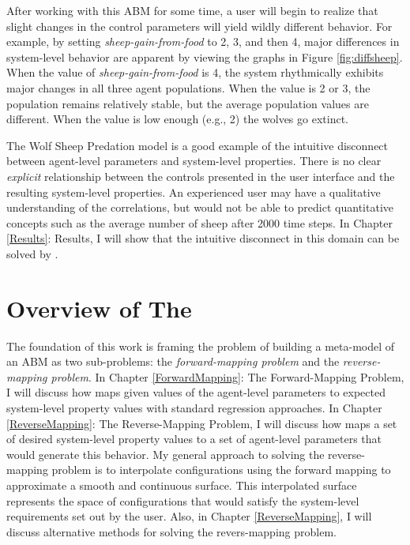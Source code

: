 After working with this ABM for some time, a user will begin to realize that slight changes in the control parameters will yield wildly different behavior.
For example, by setting \textit{sheep-gain-from-food} to 2, 3, and then 4, major differences in system-level behavior are apparent by viewing the graphs in Figure \ref{fig:diffsheep}.
When the value of \textit{sheep-gain-from-food} is 4, the system rhythmically exhibits major changes in all three agent populations.
When the value is 2 or 3, the population remains relatively stable, but the average population values are different.
When the value is low enough (e.g., 2) the wolves go extinct.

The Wolf Sheep Predation model is a good example of the intuitive disconnect between agent-level parameters and system-level properties.
There is no clear \textit{explicit} relationship between the controls presented in the user interface and the resulting system-level properties.
An experienced user may have a qualitative understanding of the correlations, but would not be able to predict quantitative concepts such as the average number of sheep after 2000 time steps.
In  Chapter \ref{Results}: Results, I will show that the intuitive disconnect in this domain can be solved by \fw.


\section{Overview of The \framework}


The foundation of this work is framing the problem of building a meta-model of an ABM as two sub-problems: the \textit{forward-mapping problem} and the \textit{reverse-mapping problem}.
In Chapter \ref{ForwardMapping}: The Forward-Mapping Problem, I will discuss how \fw maps given values of the agent-level parameters to expected system-level property values with standard regression approaches.
In Chapter \ref{ReverseMapping}: The Reverse-Mapping Problem, I will discuss how \fw maps a set of desired system-level property values to a set of agent-level parameters that would generate this behavior.
My general approach to solving the reverse-mapping problem is to interpolate configurations using the forward mapping to approximate a smooth and continuous surface.
This interpolated surface represents the space of configurations that would satisfy the system-level requirements set out by the user.
Also, in Chapter \ref{ReverseMapping}, I will discuss alternative methods for solving the revers-mapping problem.


